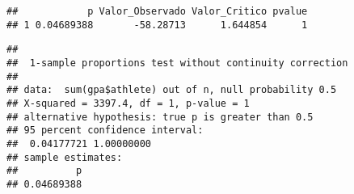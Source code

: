 \documentclass[
]{article}
\newenvironment{Shaded}{\begin{snugshade}}{\end{snugshade}}
\newcommand{\AttributeTok}[1]{\textcolor[rgb]{0.80,0.80,0.80}{#1}}
\newcommand{\CommentTok}[1]{\textcolor[rgb]{0.50,0.62,0.50}{#1}}
\newcommand{\ConstantTok}[1]{\textcolor[rgb]{0.86,0.64,0.64}{\textbf{#1}}}
\newcommand{\DecValTok}[1]{\textcolor[rgb]{0.86,0.86,0.80}{#1}}
\newcommand{\FloatTok}[1]{\textcolor[rgb]{0.75,0.75,0.82}{#1}}
\newcommand{\FunctionTok}[1]{\textcolor[rgb]{0.94,0.94,0.56}{#1}}
\newcommand{\NormalTok}[1]{\textcolor[rgb]{0.80,0.80,0.80}{#1}}
\newcommand{\OtherTok}[1]{\textcolor[rgb]{0.94,0.94,0.56}{#1}}
\newcommand{\SpecialCharTok}[1]{\textcolor[rgb]{0.86,0.64,0.64}{#1}}
\newcommand{\StringTok}[1]{\textcolor[rgb]{0.80,0.58,0.58}{#1}}
\begin{document}
\begin{Shaded}
\end{Shaded}

\begin{verbatim}
##            p Valor_Observado Valor_Critico pvalue
## 1 0.04689388       -58.28713      1.644854      1
\end{verbatim}

\begin{Shaded}
\end{Shaded}

\begin{verbatim}
## 
##  1-sample proportions test without continuity correction
## 
## data:  sum(gpa$athlete) out of n, null probability 0.5
## X-squared = 3397.4, df = 1, p-value = 1
## alternative hypothesis: true p is greater than 0.5
## 95 percent confidence interval:
##  0.04177721 1.00000000
## sample estimates:
##          p 
## 0.04689388
\end{verbatim}
\end{document}
